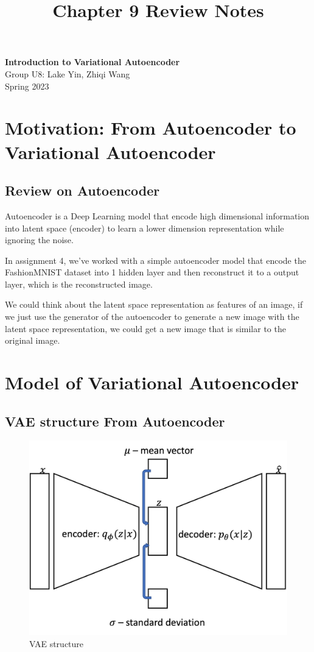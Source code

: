 \documentclass[11pt]{article}
\theoremstyle{definition}
\begin{document}
\setcounter{section}{0}
\title{Chapter 9 Review Notes}

\thispagestyle{empty}

\begin{center}
{\LARGE \bf Introduction to Variational Autoencoder}\\
{\large Group U8: Lake Yin, Zhiqi Wang}\\
Spring 2023
\end{center}
\section{Motivation: From Autoencoder to Variational Autoencoder}
\subsection{Review on Autoencoder}
Autoencoder is a Deep Learning model that encode high dimensional information into latent space (encoder) to learn a lower dimension representation while ignoring the noise. 

In assignment 4, we've worked with a simple autoencoder model that encode the FashionMNIST dataset into 1 hidden layer and then reconstruct it to a output layer, which is the reconstructed image.

We could think about the latent space representation as features of an image, if we just use the generator of the autoencoder to generate a new image with the latent space representation, we could get a new image that is similar to the original image.

\section{Model of Variational Autoencoder}

\subsection{VAE structure From Autoencoder}
\begin{figure}[h]
    \begin{center}
\includegraphics[scale=0.5]{vae-graph.png}
    \end{center}
\caption{VAE structure}
\end{figure}
\end{document}
